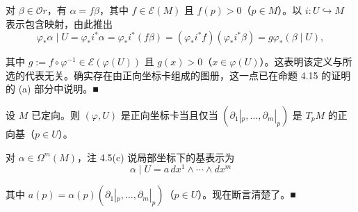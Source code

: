\begin{remark}
\begin{items}
\proofhead
对 $ \beta \in \mathcal{O}r $，有 $ \alpha = f\beta $，其中 $ f \in \mathcal{E}(M) $ 且 $ f(p) > 0 $（$ p \in M $）。以 $ i: U \hookrightarrow M $ 表示包含映射，由此推出
\[
\varphi_{\ast}\alpha \mid U = \varphi_{\ast}i^{\ast}\alpha = \varphi_{\ast}i^{\ast}(f\beta) = (\varphi_{\ast}i^{\ast}f)(\varphi_{\ast}i^{\ast}\beta) = g\varphi_{\ast}(\beta \mid U) ,
\]

其中 $ g := f \circ \varphi^{-1} \in \mathcal{E}(\varphi(U)) $ 且 $ g(x) > 0 $（$ x \in \varphi(U) $）。这表明该定义与所选的代表无关。确实存在由正向坐标卡组成的图册，这一点已在命题 4.15 的证明的 (a) 部分中说明。\nobreak\hspace{0.35em}■

\item

设 $ M $ 已定向。则 $ (\varphi, U) $ 是正向坐标卡当且仅当 $ (\partial_1|_p, \ldots, \partial_m|_p) $ 是 $ T_{p}M $ 的正向基（$ p \in U $）。

\proofhead
对 $ \alpha \in \Omega^{m}(M) $，注 4.5(c) 说局部坐标下的基表示为
\[
\alpha \mid U = a\,dx^{1} \wedge \cdots \wedge dx^{m}
\]

其中 $ a(p) = \alpha(p)(\partial_1|_p, \ldots, \partial_m|_p) $（$ p \in U $）。现在断言清楚了。\nobreak\hspace{0.35em}■

\end{items}

\end{remark}

